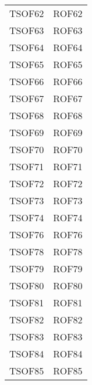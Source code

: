 \documentclass[../PianoDiQualifica_v3.0.0.tex]{subfiles}
\begin{document}
\begin{longtable}[c] { >{\centering\arraybackslash}p{3cm} >{\centering\arraybackslash}p{3cm}}
			TSOF62 & ROF62 \\
			\addlinespace[0.3em]
			\midrule
			\addlinespace[0.3em]
			TSOF63 & ROF63 \\
			\addlinespace[0.3em]
			\midrule
			\addlinespace[0.3em]
			TSOF64 & ROF64 \\
			\addlinespace[0.3em]
			\midrule
			\addlinespace[0.3em]
			TSOF65 & ROF65 \\
			\addlinespace[0.3em]
			\midrule
			\addlinespace[0.3em]
			TSOF66 & ROF66 \\
			\addlinespace[0.3em]
			\midrule
			\addlinespace[0.3em]
			TSOF67 & ROF67 \\
			\addlinespace[0.3em]
			\midrule
			\addlinespace[0.3em]
			TSOF68 & ROF68 \\
			\addlinespace[0.3em]
			\midrule
			\addlinespace[0.3em]
			TSOF69 & ROF69 \\
			\addlinespace[0.3em]
			\midrule
			\addlinespace[0.3em]
			TSOF70 & ROF70 \\
			\addlinespace[0.3em]
			\midrule
			\addlinespace[0.3em]
			TSOF71 & ROF71 \\
			\addlinespace[0.3em]
			\midrule
			\addlinespace[0.3em]
			TSOF72 & ROF72 \\
			\addlinespace[0.3em]
			\midrule
			\addlinespace[0.3em]
			TSOF73 & ROF73 \\
			\addlinespace[0.3em]
			\midrule
			\addlinespace[0.3em]
			TSOF74 & ROF74 \\
			\addlinespace[0.3em]
			\midrule
			\addlinespace[0.3em]
			TSOF76 & ROF76 \\
			\addlinespace[0.3em]
			\midrule
			\addlinespace[0.3em]
			TSOF78 & ROF78 \\
			\addlinespace[0.3em]
			\midrule
			\addlinespace[0.3em]
			TSOF79 & ROF79 \\
			\addlinespace[0.3em]
			\midrule
			\addlinespace[0.3em]
			TSOF80 & ROF80 \\
			\addlinespace[0.3em]
			\midrule
			\addlinespace[0.3em]
			TSOF81 & ROF81 \\
			\addlinespace[0.3em]
			\midrule
			\addlinespace[0.3em]
			TSOF82 & ROF82 \\
			\addlinespace[0.3em]
			\midrule
			\addlinespace[0.3em]
			TSOF83 & ROF83 \\
			\addlinespace[0.3em]
			\midrule
			\addlinespace[0.3em]
			TSOF84 & ROF84\\
			\addlinespace[0.3em]
			\midrule
			\addlinespace[0.3em]
			TSOF85 & ROF85 \\

\end{longtable}
\end{document}
